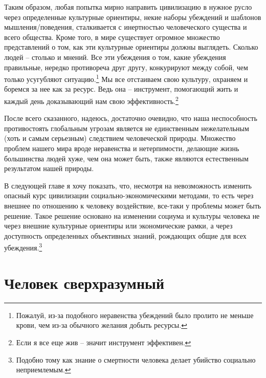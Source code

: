 \documentclass[12pt,a4paper]{report}
\begin{document}
\noindent Таким образом, любая попытка мирно направить цивилизацию в нужное русло через определенные культурные ориентиры, некие наборы убеждений и шаблонов мышления\hspace{.05em}/\hspace{.05em}поведения, сталкивается с инертностью человеческого существа и всего общества. Кроме того, в мире существует огромное множество представлений о том, как эти культурные ориентиры должны выглядеть. Сколько людей -- столько и мнений. Все эти убеждения о том, какие убеждения правильные, нередко противореча друг другу, конкурируют между собой, чем только усугубляют ситуацию.\footnote{Пожалуй, из-за подобного неравенства убеждений было пролито не меньше крови, чем из-за обычного желания добыть ресурсы.} Мы все отстаиваем свою культуру, охраняем и боремся за нее как за ресурс. Ведь она -- инструмент, помогающий жить и каждый день доказывающий нам свою эффективность.\footnote{Если я все еще жив -- значит инструмент эффективен.}

\noindent После всего сказанного, надеюсь, достаточно очевидно, что наша неспособность противостоять глобальным угрозам является не единственным нежелательным (хоть и самым серьезным) следствием человеческой природы. Множество проблем нашего мира вроде неравенства и нетерпимости, делающие жизнь большинства людей хуже, чем она может быть, также являются естественным результатом нашей природы.

\noindent В следующей главе я хочу показать, что, несмотря на невозможность изменить опасный курс цивилизации социально-экономическими методами, то есть через внешнее по отношению к человеку воздействие, все-таки у проблемы может быть решение. Такое решение основано на изменении социума и культуры человека не через внешние культурные ориентиры или экономические рамки, а через доступность определенных объективных знаний, рождающих общие для всех убеждения.\footnote{Подобно тому как знание о смертности человека делает убийство социально неприемлемым.}

\chapter*{Человек сверхразумный}
\end{document}
